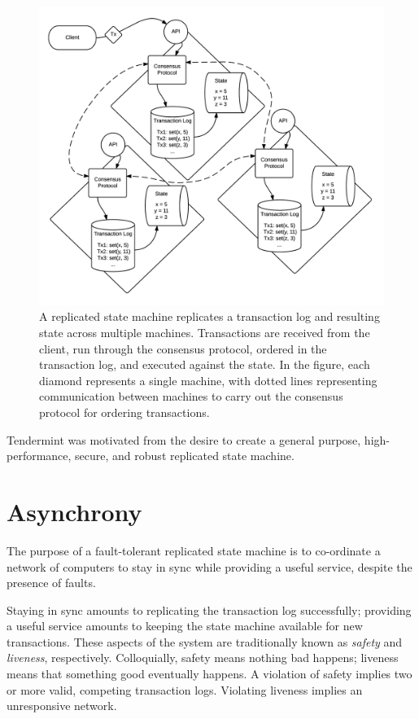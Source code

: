 \begin{figure}[]
	\includegraphics[width=\linewidth,height=\textheight,keepaspectratio]{figures/diagrams/state_machine.png}
    	\centering
	\caption[Overview of replicated state machine architecture]{
A replicated state machine replicates a transaction log and resulting state across multiple machines. 
Transactions are received from the client, 
run through the consensus protocol, 
ordered in the transaction log,
and executed against the state. 
In the figure, each diamond represents a single machine, 
with dotted lines representing communication between machines to carry out the consensus protocol for ordering transactions.}
	\label{fig:replicated_state_machine}
\end{figure}

Tendermint was motivated from the desire to create a general purpose, high-performance, secure, and robust replicated state machine.

\section{Asynchrony}

The purpose of a fault-tolerant replicated state machine is to co-ordinate 
a network of computers to stay in sync while providing a useful service, 
despite the presence of faults.

Staying in sync amounts to replicating the transaction log successfully; 
providing a useful service amounts to keeping the state machine available for new transactions.
These aspects of the system are traditionally known as \emph{safety} and \emph{liveness}, respectively.
Colloquially, safety means nothing bad happens; liveness means that something good eventually happens.
A violation of safety implies two or more valid, competing transaction logs.
Violating liveness implies an unresponsive network.

